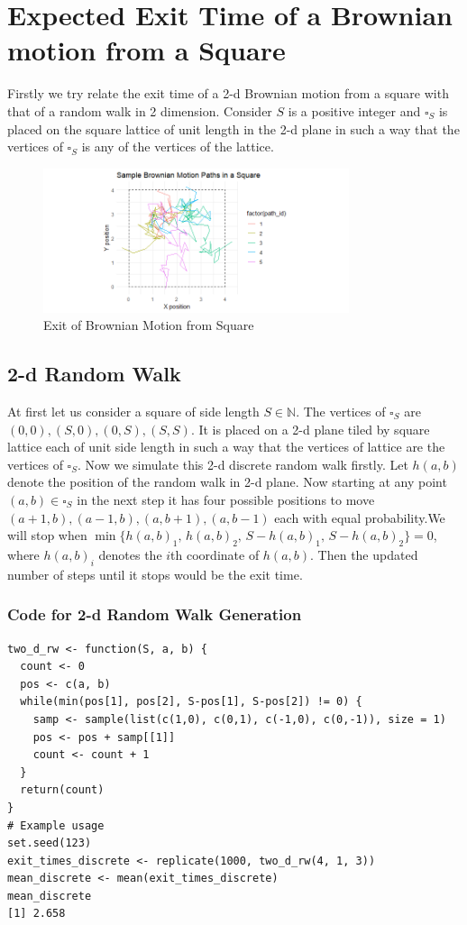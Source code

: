 \documentclass[11pt, a4paper, oneside]{report}
\numberwithin{equation}{section}
\begin{document}
\section{Expected Exit Time of a Brownian motion from a Square}
Firstly we try relate the exit time of a 2-d Brownian motion from a square with that of a random walk in 2 dimension. Consider $S$ is a positive integer and $\square_S$ is placed on the square lattice of unit length in the 2-d plane in such a way that the vertices of $\square_S$ is any of the vertices of the lattice.
\begin{figure}[htbp]
    \centering
    \includegraphics[width=0.8\textwidth]{Exit of BM from Square.png}
    \caption{Exit of Brownian Motion from Square}
\end{figure}
\subsection{2-d Random Walk}
At first let us consider a square of side length $S \in \mathbb{N}$. The vertices of $\square_S$ are $(0,0),(S,0),(0,S),(S,S)$. It is placed on a 2-d plane tiled by square lattice each of unit side length in such a way that the vertices of lattice are the vertices of $\square_S$. Now we simulate this 2-d discrete random walk firstly. Let $h(a,b)$ denote the position of the random walk in 2-d plane. Now starting at any point $(a, b) \in \square_S$ in the next step it has four possible positions to move $(a + 1, b), (a -1, b),(a, b + 1), (a, b - 1)$ each with equal probability.We will stop when $\min\{h(a, b)_1,\, h(a, b)_2,\, S - h(a, b)_1,\, S - h(a, b)_2\} = 0$, where $h(a, b)_i$ denotes the $i$th coordinate of $h(a,b)$. Then the updated number of steps until it stops would be the exit time.

\subsubsection{Code for 2-d Random Walk Generation}
\begin{verbatim}
two_d_rw <- function(S, a, b) {
  count <- 0
  pos <- c(a, b)
  while(min(pos[1], pos[2], S-pos[1], S-pos[2]) != 0) {
    samp <- sample(list(c(1,0), c(0,1), c(-1,0), c(0,-1)), size = 1)
    pos <- pos + samp[[1]]
    count <- count + 1
  }
  return(count)
}    
# Example usage
set.seed(123)
exit_times_discrete <- replicate(1000, two_d_rw(4, 1, 3))
mean_discrete <- mean(exit_times_discrete)
mean_discrete
[1] 2.658
\end{verbatim}
\end{document}
